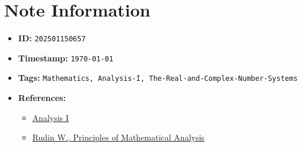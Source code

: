 \clearpage
{}
\label{202501150657}
\renewcommand{\notetitle}{Definition of Field}

\section*{Note Information}
\begin{itemize}
  \item \textbf{ID:} \texttt{202501150657}
  \item \textbf{Timestamp:} \texttt{\today \ \currenttime}
  \item \textbf{Tags:} \texttt{Mathematics, Analysis-I, The-Real-and-Complex-Number-Systems}
  \item \textbf{References:}
    \begin{itemize}
      \item \href{https://ocw.mit.edu/courses/18-100b-analysis-i-fall-2010/}{Analysis I}
      \item \href{/home/garrett/Personal/References/Mathematics/Analysis-I/Rudin.pdf}{Rudin W., Principles of Mathematical Analysis}
    \end{itemize}
\end{itemize}


